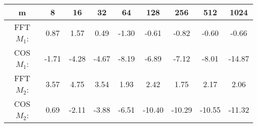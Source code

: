 
\begin{minipage}{\textwidth}
\begin{center}
\begin{framed}
\begin{tabular}{c|c|c|c|c|c|c|c|c}
m & 8 & 16 & 32 & 64 & 128 & 256 & 512 & 1024 \\
\hline
FFT \(M_1\): &0.87 & 1.57 &0.49& -1.30 & -0.61 & -0.82 & -0.60 & -0.66\\
COS \(M_1\): &-1.71 &  -4.28  &  -4.67 & -8.19 &  -6.89 &  -7.12 &  -8.01 & -14.87 \\
FFT \(M_2\): & 3.57 & 4.75 & 3.54 & 1.93 & 2.42 & 1.75 & 2.17 & 2.06 \\
COS \(M_2\): & 0.69 &  -2.11 & -3.88 &  -6.51 &-10.40 & -10.29 & -10.55 & -11.32\\
\end{tabular} 
 \label{table4}
\end{framed}
\end{center}
\end{minipage}
